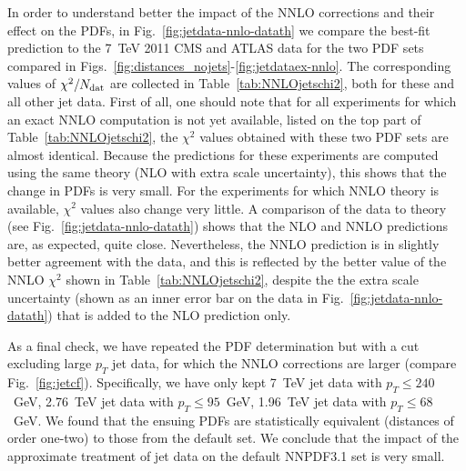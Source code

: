 
In order to understand better the impact of the NNLO corrections and
their effect on the PDFs, in 
Fig.~\ref{fig:jetdata-nnlo-datath} we compare the
best-fit prediction to 
the 7~TeV  2011 CMS 
    and ATLAS data for the two PDF sets compared in
    Figs.~\ref{fig:distances_nojets}-\ref{fig:jetdataex-nnlo}.
The corresponding values of $\chi^2/N_{\rm dat}$ are collected in
Table~\ref{tab:NNLOjetschi2}, both for these and all other jet data.
First of all, one should note that for all experiments for which an exact NNLO
 computation is not yet available, listed on the top part of
Table~\ref{tab:NNLOjetschi2}, the $\chi^2$ values obtained with these two PDF
sets are almost identical. Because the predictions for these experiments 
are computed using the same theory (NLO with extra scale uncertainty),
this shows that the change in PDFs is very small.
For the experiments for which NNLO theory is available, $\chi^2$
values also change very little. A comparison of the data to theory (see
Fig.~\ref{fig:jetdata-nnlo-datath}) shows that the NLO and NNLO
predictions are, as expected, quite close. Nevertheless, the NNLO
prediction is in slightly better agreement with the data, and this is
reflected by the
better value of the NNLO $\chi^2$ shown in
Table~\ref{tab:NNLOjetschi2}, despite the
the extra scale uncertainty (shown as an inner error bar on the data
in Fig.~\ref{fig:jetdata-nnlo-datath}) that is added to
the NLO prediction only.

As a final check, we have repeated the PDF determination but with a cut excluding
large $p_T$ jet data, for which the NNLO corrections are larger
(compare Fig.~\ref{fig:jetcf}). Specifically, we have only kept 7~TeV
jet data with $p_T\le 240$~GeV,  2.76~TeV
jet data with $p_T\le 95$~GeV,  1.96~TeV
jet data with $p_T\le 68$~GeV. We found that the ensuing PDFs are
statistically equivalent (distances of order one-two) to those from
the default set.  
We conclude that the impact of the approximate treatment of jet data
on the default NNPDF3.1 set is very small.







